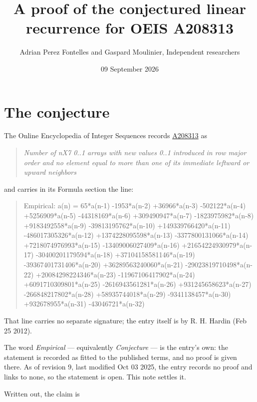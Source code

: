 \documentclass[11pt]{article}
\title{A proof of the conjectured linear recurrence for OEIS A208313}
\author{Adrian Perez Fontelles and Gaspard Moulinier, Independent researchers}
\date{09 September 2026}
\theoremstyle{definition}
\begin{document}
\maketitle
\section{The conjecture}

The Online Encyclopedia of Integer Sequences records \href{https://oeis.org/A208313}{A208313} as

\begin{quote}\itshape Number of nX7 0..1 arrays with new values 0..1 introduced in row major order and no element equal to more than one of its immediate leftward or upward neighbors\end{quote}

and carries in its Formula section the line:

\begin{quote}\ttfamily Empirical: a(n) = 65*a(n-1) -1953*a(n-2) +36966*a(n-3) -502122*a(n-4) +5256909*a(n-5) -44318169*a(n-6) +309490947*a(n-7) -1823975982*a(n-8) +9183492558*a(n-9) -39813195762*a(n-10) +149339766420*a(n-11) -486017305326*a(n-12) +1374228095598*a(n-13) -3377800131066*a(n-14) +7218074976993*a(n-15) -13409006027409*a(n-16) +21654224930979*a(n-17) -30400201179594*a(n-18) +37104158581146*a(n-19) -39367401731406*a(n-20) +36289563240060*a(n-21) -29023819710498*a(n-22) +20084298224346*a(n-23) -11967106417902*a(n-24) +6091710309801*a(n-25) -2616943561281*a(n-26) +931245658623*a(n-27) -266848217802*a(n-28) +58935744018*a(n-29) -9341138457*a(n-30) +932678955*a(n-31) -43046721*a(n-32)\end{quote}

That line carries no separate signature; the entry itself is by R. H. Hardin (Feb 25 2012).

The word {\itshape Empirical} --- equivalently {\itshape Conjecture} --- is the entry's own: the statement is recorded as fitted to the published terms, and no proof is given there. As of revision 9, last modified Oct 03 2025, the entry records no proof and links to none, so the statement is open. This note settles it.

Written out, the claim is
\end{document}

